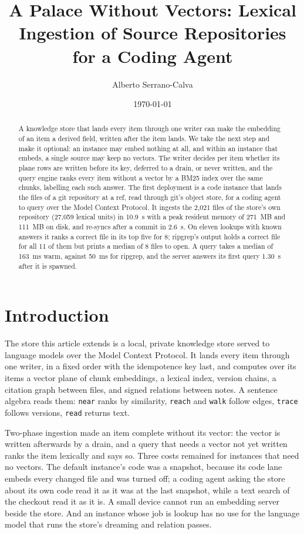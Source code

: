 \documentclass[11pt]{article}
\title{A Palace Without Vectors: Lexical Ingestion of Source Repositories for a Coding Agent}
\author{Alberto Serrano-Calva}
\date{\today}
\theoremstyle{plain}
\theoremstyle{definition}
\theoremstyle{remark}
\newcommand{\code}[1]{\texttt{#1}}
\newcommand{\nfiles}{2{,}021}
\newcommand{\nunits}{27{,}059}
\newcommand{\tfull}{10.9}
\newcommand{\rssfull}{271}
\newcommand{\storemb}{111}
\newcommand{\tincr}{2.6}
\newcommand{\hits}{8}
\newcommand{\rghits}{all 11}
\newcommand{\rgfiles}{8}
\newcommand{\qwarm}{163}
\newcommand{\rgms}{50}
\newcommand{\mcpq}{1.30}
\begin{document}
\maketitle

\begin{abstract}
A knowledge store that lands every item through one writer can make the embedding of an item a
derived field, written after the item lands. We take the next step and make it optional: an
instance may embed nothing at all, and within an instance that embeds, a single source may keep no
vectors. The writer decides per item whether its plane rows are written before its key, deferred to
a drain, or never written, and the query engine ranks every item without a vector by a BM25 index
over the same chunks, labelling each such answer. The first deployment is a code instance that
lands the files of a git repository at a ref, read through git's object store, for a coding agent
to query over the Model Context Protocol. It ingests the \nfiles{} files of the store's own
repository (\nunits{} lexical units) in \tfull{}~s with a peak resident memory of \rssfull{}~MB and
\storemb{}~MB on disk, and re-syncs after a commit in \tincr{}~s. On eleven lookups with known
answers it ranks a correct file in its top five for \hits{}; ripgrep's output holds a correct
file for \rghits{} of them but prints a median of \rgfiles{} files to open. A query takes a median
of \qwarm{}~ms warm, against \rgms{}~ms for ripgrep, and the server answers its first query
\mcpq{}~s after it is spawned.
\end{abstract}

\section{Introduction}

The store this article extends is a local, private knowledge store served to language models
over the Model Context Protocol. It lands every item through one writer, in a fixed order with the
idempotence key last, and computes over its items a vector plane of chunk embeddings, a lexical
index, version chains, a citation graph between files, and signed relations between notes. A
sentence algebra reads them: \code{near} ranks by similarity, \code{reach} and \code{walk} follow
edges, \code{trace} follows versions, \code{read} returns text.

Two-phase ingestion made an item complete without its vector: the vector is written afterwards by
a drain, and a query that needs a vector not yet written ranks the item lexically and says so. Three
costs remained for instances that need no vectors. The default instance's code was a snapshot,
because its code lane embeds every changed file and was turned off; a coding agent asking the store
about its own code read it as it was at the last snapshot, while a text search of the checkout read it as
it is. A small device cannot run an embedding server beside the store. And an instance whose job is
lookup has no use for the language model that runs the store's dreaming and relation passes.
\end{document}
